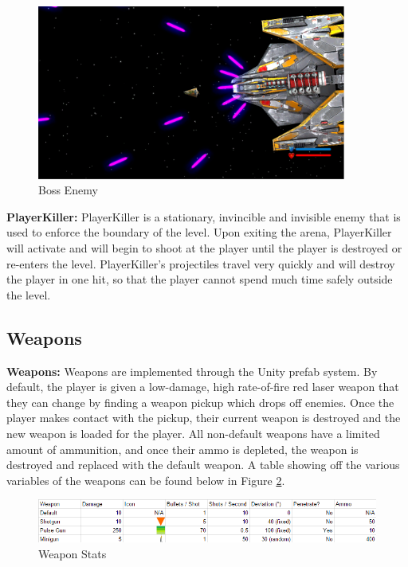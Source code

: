 \documentclass[12pt]{article}       %
\begin{document}
\begin{figure} [H]\centering  \includegraphics[width=4in]{BossShooting.png} \caption{Boss Enemy} \label{BossImage} \end{figure} 

{\bf PlayerKiller:} PlayerKiller is a stationary, invincible and invisible enemy that is used to enforce the boundary of the level. Upon exiting the arena, PlayerKiller will activate and will begin to shoot at the player until the player is destroyed or re-enters the level. PlayerKiller's projectiles travel very quickly and will destroy the player in one hit, so that the player cannot spend much time safely outside the level.


\subsection{Weapons} %

{\bf Weapons:} Weapons are implemented through the Unity prefab system. By default, the player is given a low-damage, high rate-of-fire red laser weapon that they can change by finding a weapon pickup which drops off enemies. Once the player makes contact with the pickup, their current weapon is destroyed and the new weapon is loaded for the player. All non-default weapons have a limited amount of ammunition, and once their ammo is depleted, the weapon is destroyed and replaced with the default weapon. A table showing off the various variables of the weapons can be found below in Figure \ref{stats}.

\begin{figure} [H]
\includegraphics[width=6in]{stats.png}
\centering
\caption{Weapon Stats} \label{stats}
\end{figure}
\end{document}

